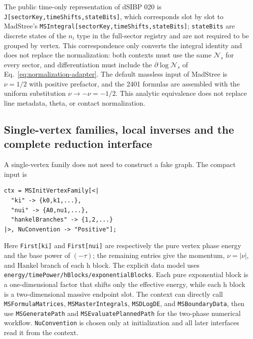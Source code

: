 \documentclass[11pt,a4paper]{article}
\newcommand{\cN}{\mathcal N}
\begin{document}
The public time-only representation of dSIBP 020 is \texttt{J[sectorKey,timeShifts,stateBits]}, which corresponds slot by slot to MadStree's \texttt{MSIntegral[sectorKey,timeShifts,stateBits]}; \texttt{stateBits} are discrete states of the $n_i$ type in the full-sector registry and are not required to be grouped by vertex. This correspondence only converts the integral identity and does not replace the normalization: both contexts must use the same $\cN_s$ for every sector, and differentiation must include the $\partial\log\cN_s$ of Eq.~\eqref{eq:normalization-adapter}. The default massless input of MadStree is $\nu=1/2$ with positive prefactor, and the 2401 formulas are assembled with the uniform substitution $\nu\to-\nu=-1/2$. This analytic equivalence does not replace line metadata, theta, or contact normalization.

\subsection{Single-vertex families, local inverses and the complete reduction interface}

A single-vertex family does not need to construct a fake graph. The compact input is
\begin{verbatim}
ctx = MSInitVertexFamily[<|
  "ki" -> {k0,k1,...},
  "nui" -> {A0,nu1,...},
  "hankelBranches" -> {1,2,...}
|>, NuConvention -> "Positive"];
\end{verbatim}
Here \texttt{First[ki]} and \texttt{First[nui]} are respectively the pure vertex phase
energy and the base power of $(-\tau)$; the remaining entries give the momentum,
$\nu=|\nu|$, and Hankel branch of each h block. The explicit data model uses
\texttt{energy/timePower/hBlocks/exponentialBlocks}. Each pure exponential block is a
one-dimensional factor that shifts only the effective energy, while each h block is a
two-dimensional massive endpoint slot. The context can directly call
\texttt{MSFormulaMatrices}, \texttt{MSMasterIntegrals}, \texttt{MSDLogDE}, and
\texttt{MSBoundaryData}, then use \texttt{MSGeneratePath} and
\texttt{MSEvaluatePlannedPath} for the two-phase numerical workflow.
\texttt{NuConvention} is chosen only at initialization and all later interfaces read it
from the context.
\end{document}
